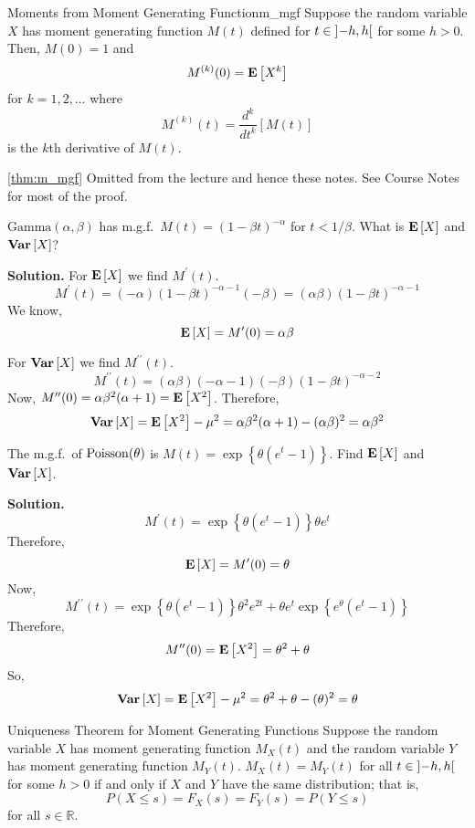 \begin{Theorem}{Moments from Moment Generating Function}{m_mgf}
    Suppose the random variable $ X $ has moment generating
    function $ M(t) $ defined for $ t\in\interval[open]{-h}{h} $
    for some $ h>0 $. Then, $ M(0)=1 $ and
    \[ M^{(k)}(0)=\bm{\mathrm{E}}\left[X^k\right] \]
    for $ k=1,2,\ldots $ where
    \[ M^{(k)}(t)=\frac{d^k}{dt^k} \left[ M(t) \right] \]
    is the $ k $th derivative of $ M(t) $.
\end{Theorem}
\begin{Proof}{\ref{thm:m_mgf}}{}
    Omitted from the lecture and hence these notes.
    See Course Notes for most of the proof.
\end{Proof}

\begin{Example}{}{}
    $ \text{Gamma}(\alpha,\beta) $ has m.g.f.\
    $ \displaystyle  M(t)=(1-\beta t)^{-\alpha} $
    for $ t<1/\beta $. What is $ \bm{\mathrm{E}}\left[X\right] $ and $ \bm{\mathrm{Var}}\left[X\right] $?

    \textbf{Solution.} For $ \bm{\mathrm{E}}\left[X\right] $ we find $ M^\prime(t) $.
    \[ M^\prime(t)=(-\alpha)(1-\beta t)^{-\alpha-1}(-\beta)=
        (\alpha \beta)(1-\beta t)^{-\alpha-1} \]
    We know,
    \[ \bm{\mathrm{E}}\left[X\right]=M^\prime(0)=\alpha\beta \]

    For $ \bm{\mathrm{Var}}\left[X\right] $ we find $ M^{\prime\prime}(t) $.
    \[ M^{\prime\prime}(t)=(\alpha\beta)(-\alpha-1)(-\beta)(1-\beta t)^{-\alpha-2} \]
    Now, $ M^{\prime\prime}(0)=\alpha\beta^2(\alpha+1) =\bm{\mathrm{E}}\left[X^2\right] $. Therefore,
    \[ \bm{\mathrm{Var}}\left[X\right]=\bm{\mathrm{E}}\left[X^2\right]-\mu^2=\alpha\beta^2(\alpha+1)-(\alpha\beta)^2=\alpha\beta^2 \]
\end{Example}

\begin{Example}{}{}
    The m.g.f.\ of $ \operatorname{Poisson}(\theta) $ is $ \displaystyle  M(t)=\exp\left\{ \theta(e^t-1)\right\} $.
    Find $ \bm{\mathrm{E}}\left[X\right] $ and $ \bm{\mathrm{Var}}\left[X\right] $.

    \textbf{Solution.}
    \[ M^\prime(t)=\exp\left\{ \theta(e^t-1)\right\}\theta e^t \]
    Therefore,
    \[ \bm{\mathrm{E}}\left[X\right]=M^\prime(0)=\theta \]
    Now,
    \[ M^{\prime\prime}(t)=
        \exp\left\{ \theta(e^t-1)\right\}\theta^2 e^{2t}+\theta e^t
        \exp\left\{ e^\theta(e^t-1)\right\} \]
    Therefore,
    \[ M^{\prime\prime}(0)=\bm{\mathrm{E}}\left[X^2\right]=\theta^2+\theta \]
    So,
    \[ \bm{\mathrm{Var}}\left[X\right]=\bm{\mathrm{E}}\left[X^2\right]-\mu^2=\theta^2+\theta-(\theta)^2=\theta \]
\end{Example}

\begin{Theorem}{Uniqueness Theorem for Moment Generating Functions}{}
    Suppose the random variable $ X $ has moment generating function
    $ M_X(t) $ and the random variable $ Y $ has
    moment generating function $ M_Y(t) $.
    $ M_X(t) = M_Y(t) $ for all $ t\in\interval[open]{-h}{h} $
    for some $ h>0 $ if and only if $ X $ and $ Y $ have the same distribution;
    that is,
    \[ P(X\leqslant s)=F_X(s)=F_Y(s)=P(Y\leqslant s) \]
    for all $ s\in\mathbb{R} $.
\end{Theorem}

